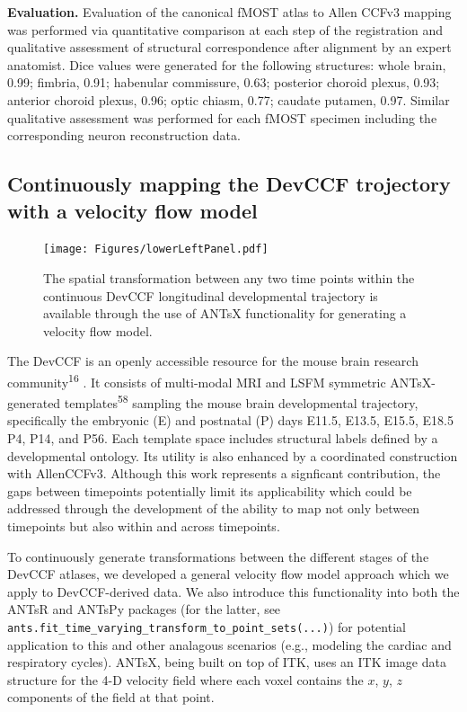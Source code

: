 \documentclass[
  12pt,
]{article}
\begin{document}
\textbf{Evaluation.} Evaluation of the canonical fMOST atlas to Allen
CCFv3 mapping was performed via quantitative comparison at each step of
the registration and qualitative assessment of structural correspondence
after alignment by an expert anatomist. Dice values were generated for
the following structures: whole brain, 0.99; fimbria, 0.91; habenular
commissure, 0.63; posterior choroid plexus, 0.93; anterior choroid
plexus, 0.96; optic chiasm, 0.77; caudate putamen, 0.97. Similar
qualitative assessment was performed for each fMOST specimen including
the corresponding neuron reconstruction data.

\subsection{Continuously mapping the DevCCF trojectory with a velocity
flow
model}\label{continuously-mapping-the-devccf-trojectory-with-a-velocity-flow-model}

\begin{figure}
\centering
\texttt{[image: Figures/lowerLeftPanel.pdf]}
\caption{The spatial transformation between any two time points within the
continuous DevCCF longitudinal developmental trajectory is available through the
use of ANTsX functionality for generating a velocity flow model.}
\label{fig:devccfvelocity}
\end{figure}

The DevCCF is an openly accessible resource for the mouse brain research
community\textsuperscript{16} . It consists of multi-modal MRI and LSFM
symmetric ANTsX-generated templates\textsuperscript{58} sampling the
mouse brain developmental trajectory, specifically the embryonic (E) and
postnatal (P) days E11.5, E13.5, E15.5, E18.5 P4, P14, and P56. Each
template space includes structural labels defined by a developmental
ontology. Its utility is also enhanced by a coordinated construction
with AllenCCFv3. Although this work represents a signficant
contribution, the gaps between timepoints potentially limit its
applicability which could be addressed through the development of the
ability to map not only between timepoints but also within and across
timepoints.

To continuously generate transformations between the different stages of
the DevCCF atlases, we developed a general velocity flow model approach
which we apply to DevCCF-derived data. We also introduce this
functionality into both the ANTsR and ANTsPy packages (for the latter,
see \texttt{ants.fit\_time\_varying\_transform\_to\_point\_sets(...)})
for potential application to this and other analagous scenarios (e.g.,
modeling the cardiac and respiratory cycles). ANTsX, being built on top
of ITK, uses an ITK image data structure for the 4-D velocity field
where each voxel contains the \(x\), \(y\), \(z\) components of the
field at that point.
\end{document}
